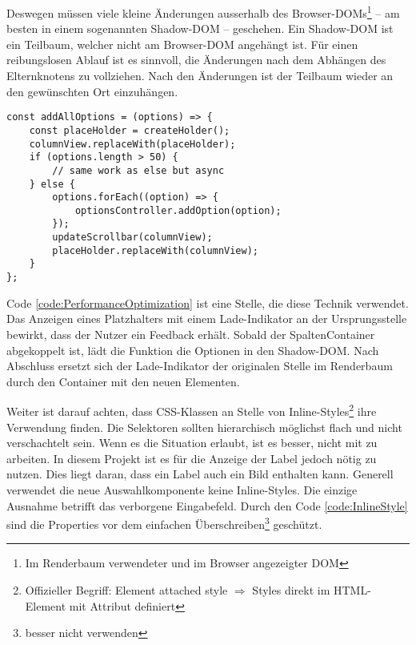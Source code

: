 Deswegen müssen viele kleine Änderungen ausserhalb des Browser-DOMs\footnote{
    Im Renderbaum verwendeter und im Browser angezeigter DOM
} – am besten in einem sogenannten Shadow-DOM – geschehen.
Ein Shadow-DOM ist ein Teilbaum, welcher nicht am Browser-DOM angehängt ist.
Für einen reibungslosen Ablauf ist es sinnvoll, die Änderungen nach dem Abhängen des Elternknotens zu vollziehen. 
Nach den Änderungen ist der Teilbaum wieder an den gewünschten Ort einzuhängen.

\begin{lstlisting}[style = htmlcssjs, caption = Performance Optimierung (aus \codestyle{columnOptionsComponent.js}), label = code:PerformanceOptimization]
const addAllOptions = (options) => {
    const placeHolder = createHolder();
    columnView.replaceWith(placeHolder);
    if (options.length > 50) {
        // same work as else but async
    } else {
        options.forEach((option) => {
            optionsController.addOption(option);
        });
        updateScrollbar(columnView);
        placeHolder.replaceWith(columnView);
    }
};
\end{lstlisting}

Code \ref{code:PerformanceOptimization} ist eine Stelle, die diese Technik verwendet.
Das Anzeigen eines Platzhalters mit einem Lade-Indikator an der Ursprungsstelle bewirkt, dass der Nutzer ein Feedback erhält.
Sobald der SpaltenContainer abgekoppelt ist, lädt die Funktion die Optionen in den Shadow-DOM.
Nach Abschluss ersetzt sich der Lade-Indikator der originalen Stelle im Renderbaum durch den Container mit den neuen Elementen. 

Weiter ist darauf achten, dass CSS-Klassen an Stelle von Inline-Styles\footnote{
    Offizieller Begriff: Element attached style $\Rightarrow$ Styles direkt im HTML-Element mit Attribut  definiert
} ihre Verwendung finden.
Die Selektoren sollten hierarchisch möglichst flach und nicht verschachtelt sein.
Wenn es die Situation erlaubt, ist es besser, nicht mit  zu arbeiten.
In diesem Projekt ist es für die Anzeige der Label jedoch nötig  zu nutzen.
Dies liegt daran, dass ein Label auch ein Bild enthalten kann.
Generell verwendet die neue Auswahlkomponente keine Inline-Styles.
Die einzige Ausnahme betrifft das verborgene Eingabefeld. 
Durch den Code \ref{code:InlineStyle} sind die Properties vor dem einfachen Überschreiben\footnote{
     besser nicht verwenden
} geschützt.

